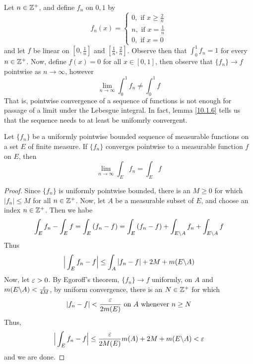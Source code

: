 \begin{example}\label{example_10.3}
    Let $n \in \mathbb{Z}^+$, and define $f_n$ on $0,1$ by
    \begin{equation*}
        f_n(x)= \begin{cases}
                    0, \text{ if } x \geq \frac{2}{n}   \\
                    n, \text{ if } x=\frac{1}{n}    \\
                    0, \text{ if } x=0
                \end{cases}
    \end{equation*}
    and let $f$ be linear on  $[0,\frac{1}{n}]$ and $[\frac{1}{n},\frac{2}{n}]$.
    Observe then that $\int_0^1{f_n}=1$ for every $n \in \mathbb{Z}^+$. Now, define
    $f(x)=0$ for all $x \in [0,1]$, then observe that $\{f_n\} \xrightarrow{} f$
    pointwise as $n \xrightarrow{} \infty$, however
    \begin{equation*}
        \lim_{n \xrightarrow{} \infty}{\int_0^1{f_n}} \neq \int_0^1{f}
    \end{equation*}
    That is, pointwise convergence of a sequence of functions is not enough for
    passage of a limit under the Lebesgue integral. In fact, lemma \ref{10.1.6}
    tells us that the sequence needs to at least be unifomrly convergent.
\end{example}

\begin{theorem}\label{10.1.7}
    Let $\{f_n\}$ be a uniformly pointwise bounded sequence of measurable
    functions on a set $E$ of finite measure. If $\{f_n\}$ converges pointwise
    to a measurable function $f$ on $E$, then
    \begin{equation*}
        \lim_{n \xrightarrow{} \infty}{\int_E{f_n}}=\int_E{f}
    \end{equation*}
\end{theorem}
\begin{proof}
    Since $\{f_n\}$ is uniformly pointwise bounded, there is an $M \geq 0$ for
    which  $|f_n| \leq M$ for all $n \in \mathbb{Z}^+$. Now, let $A$ be a measurable
    subset of  $E$, and choose an index $n \in \mathbb{Z}^+$. Then we habe
    \begin{equation*}
        \int_E{f_n}-\int_E{f}=\int_E{(f_n-f)}=
        \int_E{(f_n-f)}+\int_{E \backslash A}{f_n}+\int_{E \backslash A}{f}
    \end{equation*}
    Thus
    \begin{equation*}
        \Big{|} \int_E{f_n-f} \Big{|} \leq \int_A{|f_n-f|}+2M+m(E \backslash A)
    \end{equation*}
    Now, let $\varepsilon>0$. By Egoroff's theorem, $\{f_n\} \xrightarrow{} f$
    uniformly, on $A$ and  $m(E \backslash A)<\frac{\varepsilon}{4M}$, by uniform
    convergence, there is an $N \in \mathbb{Z}^+$ for which
    \begin{equation*}
        |f_n-f|<\frac{\varepsilon}{2m(E)} \text{ on } A \text{ whenever } n \geq N
    \end{equation*}
    Thus,
    \begin{equation*}
        \Big{|} \int_E{f_n-f} \Big{|} \leq
        \frac{\varepsilon}{2M(E)}m(A)+2M+m(E \backslash A)<\varepsilon
    \end{equation*}
    and we are done.
\end{proof}
